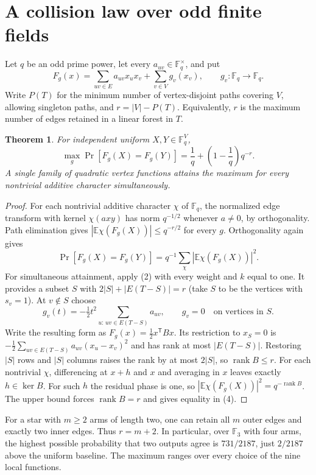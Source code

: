 \documentclass[10pt]{article}
\newtheorem{theorem}{Theorem}
\newcommand{\E}{\mathbb E}
\newcommand{\F}{\mathbb F}
\newcommand{\abs}[1]{\left|#1\right|}
\begin{document}
\newpage
\section{A collision law over odd finite fields}
Let $q$ be an odd prime power, let every $a_{uv}\in\F_q^\times$, and put
\[
 F_g(x)=\sum_{uv\in E}a_{uv}x_ux_v+\sum_{v\in V}g_v(x_v),
 \qquad g_v:\F_q\longrightarrow\F_q.
\]
Write $P(T)$ for the minimum number of vertex-disjoint paths covering
$V$, allowing singleton paths, and $r=|V|-P(T)$. Equivalently, $r$
is the maximum number of edges retained in a linear forest in $T$.

\begin{theorem}\label{thm:collision}
For independent uniform $X,Y\in\F_q^V$,
\[
 \max_g\Pr[F_g(X)=F_g(Y)]
     =\frac1q+\left(1-\frac1q\right)q^{-r}. \tag{4}
\]
A single family of quadratic vertex functions attains the maximum
for every nontrivial additive character simultaneously.
\end{theorem}

\begin{proof}
For each nontrivial additive character $\chi$ of $\F_q$, the normalized
edge transform with kernel $\chi(a xy)$ has norm $q^{-1/2}$ whenever
$a\ne0$, by orthogonality. Path elimination gives
$|\E\chi(F_g(X))|\le q^{-r/2}$ for every $g$. Orthogonality again gives
\[
 \Pr[F_g(X)=F_g(Y)]=q^{-1}\sum_{\chi}\abs{\E\chi(F_g(X))}^2.
\]
For simultaneous attainment, apply (2) with every weight and $k$ equal
to one. It provides a subset $S$ with $2|S|+|E(T-S)|=r$ (take $S$ to
be the vertices with $s_v=1$). At $v\notin S$ choose
\[
  g_v(t)=-\tfrac12 t^2\sum_{u:\,uv\in E(T-S)}a_{uv},
  \qquad g_v=0\quad\text{on vertices in }S.
\]
Write the resulting form as $F_g(x)=\tfrac12 x^\mathsf{T}Bx$.
Its restriction to $x_S=0$ is
$-\tfrac12\sum_{uv\in E(T-S)}a_{uv}(x_u-x_v)^2$ and has rank
at most $|E(T-S)|$. Restoring $|S|$ rows and $|S|$ columns raises the
rank by at most $2|S|$, so $\operatorname{rank} B\le r$.
For each nontrivial $\chi$, differencing at $x+h$ and $x$ and averaging
in $x$ leaves exactly $h\in\ker B$. For such $h$ the residual phase is
one, so $|\E\chi(F_g(X))|^2=q^{-\operatorname{rank} B}$. The upper bound
forces $\operatorname{rank} B=r$ and gives equality in (4).
\end{proof}

For a star with $m\ge2$ arms of length two, one can retain all $m$
outer edges and exactly two inner edges. Thus $r=m+2$. In particular,
over $\F_3$ with four arms, the highest possible probability that two
outputs agree is $731/2187$, just $2/2187$ above the uniform baseline.
The maximum ranges over every choice of the nine local functions.
\end{document}
